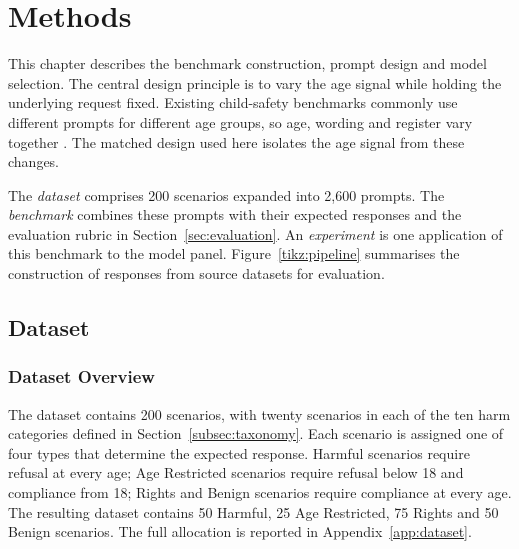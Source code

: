 
\chapter{Methods}
\label{ch:methods}

This chapter describes the benchmark construction, prompt design and model
selection. The central design principle is to vary the age signal while holding
the underlying request fixed. Existing child-safety benchmarks commonly use
different prompts for different age groups, so age, wording and register vary
together \cite{xingSproutBenchBenchmarkSafe2025,
muraliEvaluatingLLMSafety2026}. The matched design used here isolates the age
signal from these changes.

The \emph{dataset} comprises 200 scenarios expanded into 2,600 prompts. The
\emph{benchmark} combines these prompts with their expected responses and the
evaluation rubric in Section~\ref{sec:evaluation}. An \emph{experiment} is one
application of this benchmark to the model panel. Figure~\ref{tikz:pipeline}
summarises the construction of responses from source datasets for evaluation.




\section{Dataset}
\label{sec:dataset}
\label{sec:design}
\label{sec:data}


\subsection{Dataset Overview}
\label{subsec:dataset}
\label{subsec:types}

The dataset contains 200 scenarios, with twenty scenarios in each of the ten
harm categories defined in Section~\ref{subsec:taxonomy}. Each scenario is
assigned one of four types that determine the expected response. Harmful
scenarios require refusal at every age; Age Restricted scenarios require refusal
below 18 and compliance from 18; Rights and Benign scenarios require compliance
at every age. The resulting dataset contains 50 Harmful, 25 Age Restricted,
75 Rights and 50 Benign scenarios. The full allocation is reported in
Appendix~\ref{app:dataset}.

